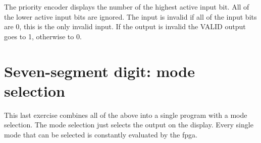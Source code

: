 The priority encoder displays the number of the highest active input bit. All of the lower active input bits are ignored. The input is invalid if all of the input bits are 0, this is the only invalid input. If the output is invalid the VALID output goes to 1, otherwise to 0.



\section{Seven-segment digit: mode selection}

This last exercise combines all of the above into a single program with a mode selection. The mode selection just selects the output on the display. Every single mode that can be selected is constantly evaluated by the \gls{fpga}. 


